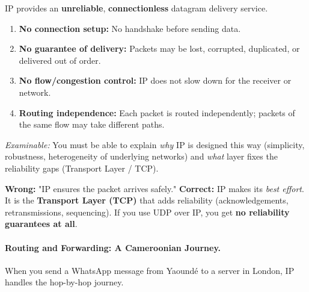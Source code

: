 \documentclass[11pt]{article}
\begin{document}
\begin{propriete}
IP provides an \textbf{unreliable}, \textbf{connectionless} datagram delivery service.
\begin{enumerate}
    \item \textbf{No connection setup:} No handshake before sending data.
    \item \textbf{No guarantee of delivery:} Packets may be lost, corrupted, duplicated, or delivered out of order.
    \item \textbf{No flow/congestion control:} IP does not slow down for the receiver or network.
    \item \textbf{Routing independence:} Each packet is routed independently; packets of the same flow may take different paths.
\end{enumerate}
\textit{Examinable:} You must be able to explain \emph{why} IP is designed this way (simplicity, robustness, heterogeneity of underlying networks) and \emph{what} layer fixes the reliability gaps (Transport Layer / TCP).
\end{propriete}

\begin{attention}
\textbf{Wrong:} "IP ensures the packet arrives safely."
\textbf{Correct:} IP makes its \emph{best effort}. It is the \textbf{Transport Layer (TCP)} that adds reliability (acknowledgements, retransmissions, sequencing). If you use UDP over IP, you get \textbf{no reliability guarantees at all}.
\end{attention}

\paragraph{Routing and Forwarding: A Cameroonian Journey.}
When you send a WhatsApp message from Yaoundé to a server in London, IP handles the hop-by-hop journey.
\end{document}
